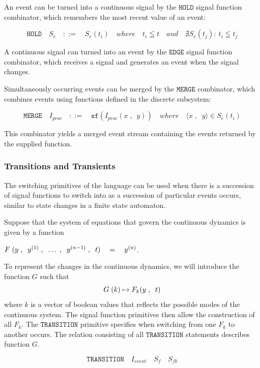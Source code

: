 \documentclass[a4paper]{article}
\begin{document}
An event can be turned into a continuous signal by the $\texttt{HOLD}$
signal function combinator, which remembers the most recent value of
an event:

\[\texttt{HOLD}\quad{}S_{e}\quad{}::=\quad{}S_{e}(t_{i})\quad{}where \quad{}t_{i}\leqq{}t\quad{} and \quad{}\nexists{S_{e}(t_{j})}:\:t_{i}\leqq{}t_{j}\]

A continuous signal can turned into an event by the $\texttt{EDGE}$
signal function combinator, which receives a signal and generates an
event when the signal changes.

Simultaneously occurring events can be merged by the $\texttt{MERGE}$
combinator, which combines events using functions defined in the
discrete subsystem:

\[\texttt{MERGE}\quad{}I_{proc}\quad{}::=\quad{}\texttt{sf}(I_{proc}(x\;,\:\;y))\quad{}where \quad{}\langle{}x\;,\;\;y\rangle{}\in{}S_{e}(t_{i})\]


This combinator yields a merged event stream containing the events
returned by the supplied function.

\subsubsection{Transitions and Transients}

The switching primitives of the language can be used when there is a
succession of signal functions to switch into as a succession of
particular events occurs, similar to state changes in a finite state
automaton.

Suppose that the system of equations that govern the continuous
dynamics is given by a function

$F\;{\mathrm\mathbf{}(}y\;,\;\;y^{(1)}\;,\;\;\ldots\;,\;\;y^{(n-1)}\;,\;\;t{\mathrm\mathbf{})}\quad{}=\quad{}y^{(n)}$. 

To represent the changes in the continuous dynamics, we will introduce
the function $G$ such
that \[G\;{\mathrm\mathbf{}(}k{\mathrm\mathbf{})}\mapsto{}F_{k}{\mathrm\mathbf{}(}y\;,\;\;t{\mathrm\mathbf{})}\]
where $k$ is a vector of boolean values that reflects the possible
modes of the continuous system. The signal function primitives then
allow the construction of all $F_{k}$. The $\texttt{TRANSITION}$ primitive
specifies when switching from one $F_{k}$ to another occurs. The
relation consisting of all $\texttt{TRANSITION}$ statements describes
function $G$.

\[\texttt{TRANSITION}\quad{}I_{event}\quad{}S_{f}\quad{}S_{fk}\]
\\  
\end{document}
